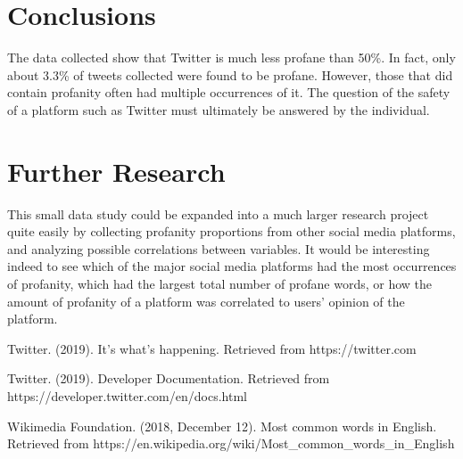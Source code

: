 \documentclass{article}
\begin{document}
\section{Conclusions}
\tab The data collected show that Twitter is much less profane than 50\%. In fact, only about 3.3\% of tweets collected were found to be profane. However, those that did contain profanity often had multiple occurrences of it. The question of the safety of a platform such as Twitter must ultimately be answered by the individual.

\section{Further Research}
\tab This small data study could be expanded into a much larger research project quite easily by collecting profanity proportions from other social media platforms, and analyzing possible correlations between variables. It would be interesting indeed to see which of the major social media platforms had the most occurrences of profanity, which had the largest total number of profane words, or how the amount of profanity of a platform was correlated to users' opinion of the platform. 

\newpage
\begin{thebibliography}{}
	Twitter. (2019). It's what's happening.
	Retrieved from {https://twitter.com}
	
	Twitter. (2019). Developer Documentation.
	Retrieved from {https://developer.twitter.com/en/docs.html}
	
	Wikimedia Foundation. (2018, December 12). Most common words in English. 
	Retrieved from {https://en.wikipedia.org/wiki/Most\_common\_words\_in\_English}
	
\end{thebibliography}
\end{document}
